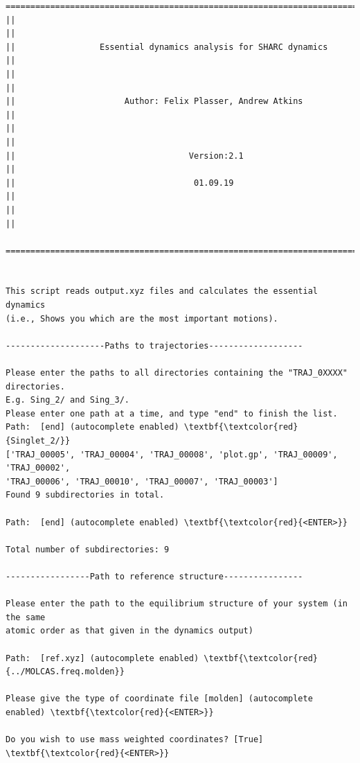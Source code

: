 \documentclass[a4paper,11pt,DIV=15,openany]{scrbook}
\begin{document}
\begin{oframed}
\footnotesize\begin{Verbatim}[commandchars=\\\{\}]
  ================================================================================
||                                                                                ||
||                 Essential dynamics analysis for SHARC dynamics                 ||
||                                                                                ||
||                      Author: Felix Plasser, Andrew Atkins                      ||
||                                                                                ||
||                                   Version:2.1                                  ||
||                                    01.09.19                                    ||
||                                                                                ||
  ================================================================================


This script reads output.xyz files and calculates the essential dynamics 
(i.e., Shows you which are the most important motions).
  
--------------------Paths to trajectories-------------------

Please enter the paths to all directories containing the "TRAJ_0XXXX" directories.
E.g. Sing_2/ and Sing_3/. 
Please enter one path at a time, and type "end" to finish the list.
Path:  [end] (autocomplete enabled) \textbf{\textcolor{red}{Singlet_2/}}
['TRAJ_00005', 'TRAJ_00004', 'TRAJ_00008', 'plot.gp', 'TRAJ_00009', 'TRAJ_00002', 
'TRAJ_00006', 'TRAJ_00010', 'TRAJ_00007', 'TRAJ_00003']
Found 9 subdirectories in total.

Path:  [end] (autocomplete enabled) \textbf{\textcolor{red}{<ENTER>}}

Total number of subdirectories: 9

-----------------Path to reference structure----------------

Please enter the path to the equilibrium structure of your system (in the same
atomic order as that given in the dynamics output)

Path:  [ref.xyz] (autocomplete enabled) \textbf{\textcolor{red}{../MOLCAS.freq.molden}}

Please give the type of coordinate file [molden] (autocomplete enabled) \textbf{\textcolor{red}{<ENTER>}}

Do you wish to use mass weighted coordinates? [True] \textbf{\textcolor{red}{<ENTER>}}


\end{Verbatim}
\end{oframed}
\end{document}

